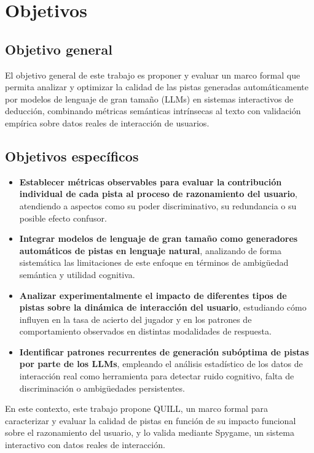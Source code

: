 \documentclass[../main.tex]{subfiles}
\begin{document}
\section{Objetivos}

\subsection{Objetivo general}

El objetivo general de este trabajo es proponer y evaluar un marco formal que permita analizar y optimizar la calidad de las pistas generadas automáticamente por modelos de lenguaje de gran tamaño (LLMs) en sistemas interactivos de deducción, combinando métricas semánticas intrínsecas al texto con validación empírica sobre datos reales de interacción de usuarios.

\subsection{Objetivos específicos}

\begin{itemize}
    \item \textbf{Establecer métricas observables para evaluar la contribución individual de cada pista al proceso de razonamiento del usuario}, atendiendo a aspectos como su poder discriminativo, su redundancia o su posible efecto confusor.

    \item \textbf{Integrar modelos de lenguaje de gran tamaño como generadores automáticos de pistas en lenguaje natural}, analizando de forma sistemática las limitaciones de este enfoque en términos de ambigüedad semántica y utilidad cognitiva.

    \item \textbf{Analizar experimentalmente el impacto de diferentes tipos de pistas sobre la dinámica de interacción del usuario}, estudiando cómo influyen en la tasa de acierto del jugador y en los patrones de comportamiento observados en distintas modalidades de respuesta.

    \item \textbf{Identificar patrones recurrentes de generación subóptima de pistas por parte de los LLMs}, empleando el análisis estadístico de los datos de interacción real como herramienta para detectar ruido cognitivo, falta de discriminación o ambigüedades persistentes.
\end{itemize}

En este contexto, este trabajo propone QUILL, un marco formal para caracterizar y evaluar la calidad de pistas en función de su impacto funcional sobre el razonamiento del usuario, y lo valida mediante Spygame, un sistema interactivo con datos reales de interacción.
\end{document}

